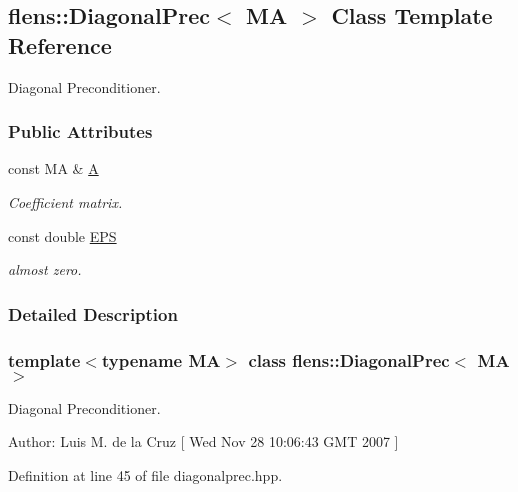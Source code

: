 \hypertarget{classflens_1_1DiagonalPrec}{
\subsection{flens::DiagonalPrec$<$ MA $>$ Class Template Reference}
\label{classflens_1_1DiagonalPrec}
}
Diagonal Preconditioner.  


\subsubsection*{Public Attributes}
\begin{CompactItemize}
\item 
\hypertarget{classflens_1_1DiagonalPrec_567ce63bae6e6e8f42ae337296d05244}{
const MA \& \hyperlink{classflens_1_1DiagonalPrec_567ce63bae6e6e8f42ae337296d05244}{A}}
\label{classflens_1_1DiagonalPrec_567ce63bae6e6e8f42ae337296d05244}

\begin{CompactList}\small\item\em Coefficient matrix. \item\end{CompactList}\item 
\hypertarget{classflens_1_1DiagonalPrec_2c1d0d16bdf8df334b89e3f8542cd4ec}{
const double \hyperlink{classflens_1_1DiagonalPrec_2c1d0d16bdf8df334b89e3f8542cd4ec}{EPS}}
\label{classflens_1_1DiagonalPrec_2c1d0d16bdf8df334b89e3f8542cd4ec}

\begin{CompactList}\small\item\em almost zero. \item\end{CompactList}\end{CompactItemize}


\subsubsection{Detailed Description}
\subsubsection*{template$<$typename MA$>$ class flens::DiagonalPrec$<$ MA $>$}

Diagonal Preconditioner. 

\begin{Desc}
\item[Author:]Luis M. de la Cruz \mbox{[} Wed Nov 28 10:06:43 GMT 2007 \mbox{]} \end{Desc}


Definition at line 45 of file diagonalprec.hpp.